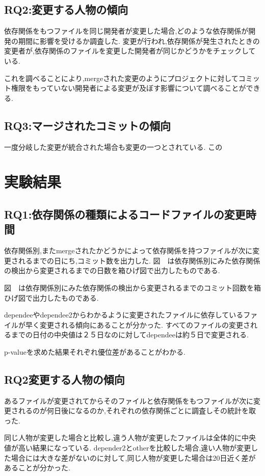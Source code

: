\documentclass{jsarticle}
\begin{document}
\subsection{RQ2:変更する人物の傾向}
依存関係をもつファイルを同じ開発者が変更した場合,どのような依存関係が開発の期間に影響を受けるか調査した.
変更が行われ,依存関係が発生されたときの変更者が,依存関係のファイルを変更した開発者が同じかどうかをチェックしている.

これを調べることにより,mergeされた変更のようにプロジェクトに対してコミット権限をもっていない開発者による変更が及ぼす影響について調べることができる.


\subsection{RQ3:マージされたコミットの傾向}
一度分岐した変更が統合された場合も変更の一つとされている.
この



\section{実験結果}
\subsection{RQ1:依存関係の種類によるコードファイルの変更時間}
依存関係別,またmergeされたかどうかによって依存関係を持つファイルが次に変更されるまでの日にち,コミット数を出力した.
図　は依存関係別にみた依存関係の検出から変更されるまでの日数を箱ひげ図で出力したものである.　　

図　は依存関係別にみた依存関係の検出から変更されるまでのコミット回数を箱ひげ図で出力したものである.

dependeeやdependee2からわかるように変更されたファイルに依存しているファイルが早く変更される傾向にあることが分かった.
すべてのファイルの変更されるまでの日付の中央値は２５日なのに対してdependeeは約５日で変更される.

p-valueを求めた結果それぞれ優位差があることがわかる.


\subsection{RQ2変更する人物の傾向}
あるファイルが変更されてからそのファイルと依存関係をもつファイルが次に変更されるのが何日後になるのか,それぞれの依存関係ごとに調査しその統計を取った.

同じ人物が変更した場合と比較し,違う人物が変更したファイルは全体的に中央値が高い結果になっている.
depender2とotherを比較した場合,違い人物が変更した場合には大きな差がないのに対して,同じ人物が変更した場合は20日近く差があることが分かった.
\end{document}
